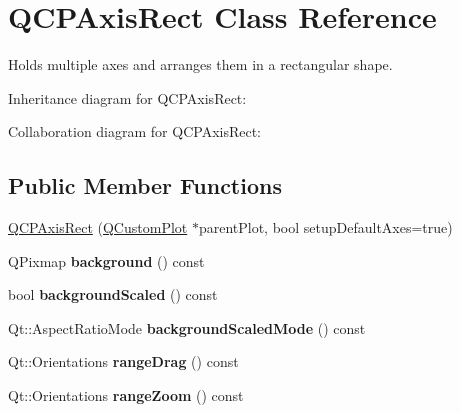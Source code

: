 \hypertarget{classQCPAxisRect}{}\section{Q\+C\+P\+Axis\+Rect Class Reference}
\label{classQCPAxisRect}


Holds multiple axes and arranges them in a rectangular shape.  




Inheritance diagram for Q\+C\+P\+Axis\+Rect\+:


Collaboration diagram for Q\+C\+P\+Axis\+Rect\+:
\subsection*{Public Member Functions}
\begin{DoxyCompactItemize}
\item 
\hyperlink{classQCPAxisRect_a60b31dece805462c1b82eea2e69ba042}{Q\+C\+P\+Axis\+Rect} (\hyperlink{classQCustomPlot}{Q\+Custom\+Plot} $\ast$parent\+Plot, bool setup\+Default\+Axes=true)
\item 
Q\+Pixmap {\bfseries background} () const \hypertarget{classQCPAxisRect_a0daa1dadd2a62dbfa37b7f742edd0059}{}\label{classQCPAxisRect_a0daa1dadd2a62dbfa37b7f742edd0059}

\item 
bool {\bfseries background\+Scaled} () const \hypertarget{classQCPAxisRect_a67c18777b88fe9c81dee3dd2b5f50e5c}{}\label{classQCPAxisRect_a67c18777b88fe9c81dee3dd2b5f50e5c}

\item 
Qt\+::\+Aspect\+Ratio\+Mode {\bfseries background\+Scaled\+Mode} () const \hypertarget{classQCPAxisRect_a3d0f42d6be11a0b3d4576402a2b0032d}{}\label{classQCPAxisRect_a3d0f42d6be11a0b3d4576402a2b0032d}

\item 
Qt\+::\+Orientations {\bfseries range\+Drag} () const \hypertarget{classQCPAxisRect_af24b46954ce27a26b23770cdb8319080}{}\label{classQCPAxisRect_af24b46954ce27a26b23770cdb8319080}

\item 
Qt\+::\+Orientations {\bfseries range\+Zoom} () const \hypertarget{classQCPAxisRect_a3397fc60e5df29089090bc236e9f05f6}{}\label{classQCPAxisRect_a3397fc60e5df29089090bc236e9f05f6}


\end{DoxyCompactItemize}
